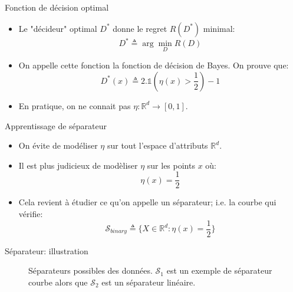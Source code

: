 \documentclass[8pt]{beamer}
\begin{document}
		\begin{frame}{Fonction de décision optimal}
			\begin{itemize}
				\item<1-> Le "décideur" optimal $D^*$ donne le regret $R(D^*)$ minimal:
					  \begin{equation}
						  D^* \triangleq \arg \min_{D} R(D) 
					  \end{equation}
				\item<2-> On appelle cette fonction la fonction de décision de Bayes. On prouve que:
					  \begin{equation}
						D^*(x) \triangleq 2.\mathbb{1}(\eta(x) > \frac{1}{2}) - 1
					  \end{equation}
				\item<3-> En pratique, on ne connait pas $\eta: \mathbb{R}^d \rightarrow [0,1]$.
			\end{itemize}
		\end{frame}

		\begin{frame}{Apprentissage de séparateur}
			\begin{itemize}
				\item<1-> On évite de modéliser $\eta$ sur tout l'espace d'attributs $\mathbb{R}^d$.
				\item<2-> Il est plus judicieux de modèliser $\eta$ sur les points $x$ où:
						\begin{equation*}
							\eta(x) = \frac{1}{2}
						\end{equation*}
				\item<3->  Cela revient à étudier ce qu'on appelle un séparateur; i.e. la courbe qui vérifie:
					\begin{equation}
						\mathscr{S}_{binary} \triangleq \{X \in \mathbb{R}^d: \eta(x) = \frac{1}{2} \}
					\end{equation}
			\end{itemize}
		\end{frame}

		\begin{frame}{Séparateur: illustration}
			\begin{figure}[H]
				
				\caption*{\tiny Séparateurs possibles des données. $\mathscr{S}_1$ est un exemple de séparateur courbe alors que $\mathscr{S}_2$ est un séparateur linéaire.}
			\end{figure}
		\end{frame}
\end{document}

